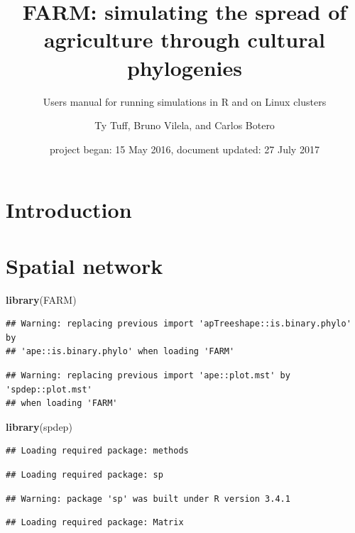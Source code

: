 \documentclass[]{book}
\title{FARM: simulating the spread of agriculture through cultural phylogenies}
\subtitle{Users manual for running simulations in R and on Linux clusters}
\author{Ty Tuff, Bruno Vilela, and Carlos Botero}
\date{project began: 15 May 2016, document updated: 27 July 2017}
\newenvironment{Shaded}{\begin{snugshade}}{\end{snugshade}}
\newcommand{\KeywordTok}[1]{\textcolor[rgb]{0.13,0.29,0.53}{\textbf{{#1}}}}
\newcommand{\NormalTok}[1]{{#1}}
\theoremstyle{definition}
\theoremstyle{definition}
\theoremstyle{remark}
\begin{document}
\maketitle

{
\setcounter{tocdepth}{1}
\tableofcontents
}
\chapter{Introduction}\label{introduction}

\chapter{Spatial network}\label{spatial-network}

\begin{Shaded}
\begin{Highlighting}[]
\KeywordTok{library}\NormalTok{(FARM)}
\end{Highlighting}
\end{Shaded}

\begin{verbatim}
## Warning: replacing previous import 'apTreeshape::is.binary.phylo' by
## 'ape::is.binary.phylo' when loading 'FARM'
\end{verbatim}

\begin{verbatim}
## Warning: replacing previous import 'ape::plot.mst' by 'spdep::plot.mst'
## when loading 'FARM'
\end{verbatim}

\begin{Shaded}
\begin{Highlighting}[]
\KeywordTok{library}\NormalTok{(spdep)}
\end{Highlighting}
\end{Shaded}

\begin{verbatim}
## Loading required package: methods
\end{verbatim}

\begin{verbatim}
## Loading required package: sp
\end{verbatim}

\begin{verbatim}
## Warning: package 'sp' was built under R version 3.4.1
\end{verbatim}

\begin{verbatim}
## Loading required package: Matrix
\end{verbatim}
\end{document}
